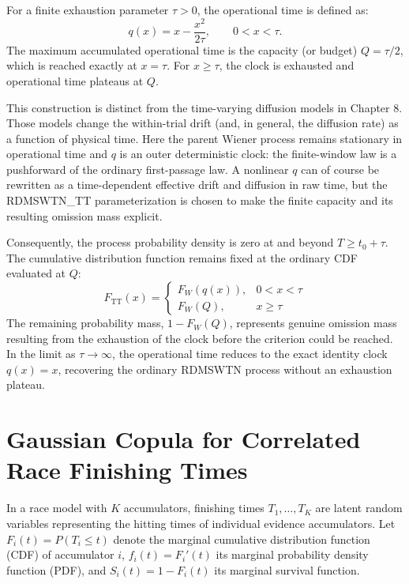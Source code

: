 \documentclass[12pt]{article}
\begin{document}
For a finite exhaustion parameter $\tau > 0$, the operational time is defined as:
\begin{equation}
  q(x) = x - \frac{x^2}{2\tau}, \qquad 0 < x < \tau.
\end{equation}
The maximum accumulated operational time is the capacity (or budget) $Q = \tau/2$, which is reached exactly at $x = \tau$. For $x \ge \tau$, the clock is exhausted and operational time plateaus at $Q$.

This construction is distinct from the time-varying diffusion models in Chapter 8. Those models change the within-trial drift (and, in general, the diffusion rate) as a function of physical time. Here the parent Wiener process remains stationary in operational time and $q$ is an outer deterministic clock: the finite-window law is a pushforward of the ordinary first-passage law. A nonlinear $q$ can of course be rewritten as a time-dependent effective drift and diffusion in raw time, but the RDMSWTN\_TT parameterization is chosen to make the finite capacity and its resulting omission mass explicit.

Consequently, the process probability density is zero at and beyond $T \ge t_0 + \tau$. The cumulative distribution function remains fixed at the ordinary CDF evaluated at $Q$:
\begin{equation}
  F_{\mathrm{TT}}(x) = \begin{cases}
    F_W(q(x)), & 0 < x < \tau \\
    F_W(Q), & x \ge \tau
  \end{cases}
\end{equation}
The remaining probability mass, $1 - F_W(Q)$, represents genuine omission mass resulting from the exhaustion of the clock before the criterion could be reached. In the limit as $\tau \to \infty$, the operational time reduces to the exact identity clock $q(x) = x$, recovering the ordinary RDMSWTN process without an exhaustion plateau.

\section{Gaussian Copula for Correlated Race Finishing Times}
In a race model with $K$ accumulators, finishing times $T_1, \dots, T_K$ are latent random variables representing the hitting times of individual evidence accumulators. Let $F_i(t) = P(T_i \le t)$ denote the marginal cumulative distribution function (CDF) of accumulator $i$, $f_i(t) = F_i'(t)$ its marginal probability density function (PDF), and $S_i(t) = 1 - F_i(t)$ its marginal survival function.
\end{document}
